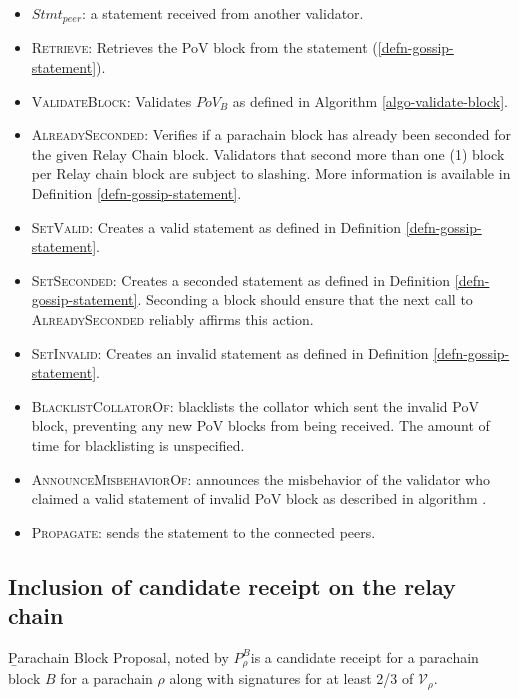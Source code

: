 \begin{itemize}
  \item $Stmt_{peer}$: a statement received from another validator.
  \item \textsc{Retrieve}: Retrieves the PoV block from the statement
  (\ref{defn-gossip-statement}).
  \item \textsc{ValidateBlock}: Validates $PoV_B$ as defined in Algorithm
  \ref{algo-validate-block}.
  \item \textsc{AlreadySeconded}: Verifies if a parachain block has already been
  seconded for the given Relay Chain block. Validators that second more than one
  (1) block per Relay chain block are subject to slashing. More information is
  available in Definition \ref{defn-gossip-statement}.
  \item \textsc{SetValid}: Creates a valid statement as defined in Definition
  \ref{defn-gossip-statement}.
  \item \textsc{SetSeconded}: Creates a seconded statement as defined in
  Definition \ref{defn-gossip-statement}. Seconding a block should ensure that
  the next call to \textsc{AlreadySeconded} reliably affirms this action.
  \item \textsc{SetInvalid}: Creates an invalid statement as defined in
  Definition \ref{defn-gossip-statement}.
  \item \textsc{BlacklistCollatorOf}: blacklists the collator which sent the
  invalid PoV block, preventing any new PoV blocks from being received. The
  amount of time for blacklisting is unspecified.
  \item \textsc{AnnounceMisbehaviorOf}: announces the misbehavior of the
  validator who claimed a valid statement of invalid PoV block as described in
  algorithm .
  \item \textsc{Propagate}: sends the statement to the connected peers.
\end{itemize}

\subsection{Inclusion of candidate receipt on the relay chain}\label{sect-inclusion-of-candidate-receipt}


\begin{definition}
  \label{defn-para-proposal}
        {\b Parachain Block Proposal}, noted by $P^B_{\rho}$is a candidate receipt for a parachain block $B$ for a parachain $\rho$ along with signatures for at least 2/3 of $\mathcal{V}_\rho$.  %

\end{definition}

